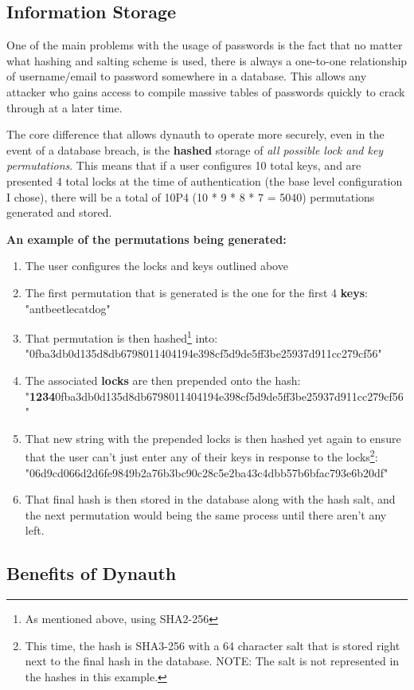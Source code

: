 \documentclass[conference]{IEEEtran}
\begin{document}
\subsection{Information Storage}
	One of the main problems with the usage of passwords is the fact that no matter what hashing and salting scheme is used, there is always a one-to-one relationship of username/email to password somewhere in a database. This allows any attacker who gains access to compile massive tables of passwords quickly to crack through at a later time.
	
	The core difference that allows dynauth to operate more securely, even in the event of a database breach, is the \textbf{hashed} storage of \textit{all possible lock and key permutations}. This means that if a user configures 10 total keys, and are presented 4 total locks at the time of authentication (the base level configuration I chose), there will be a total of 10P4 (10 * 9 * 8 * 7 = 5040) permutations generated and stored.
	
	\textbf{An example of the permutations being generated:}
	\begin{enumerate}
		\item The user configures the locks and keys outlined above
		\item The first permutation that is generated is the one for the first 4 \textbf{keys}: "antbeetlecatdog"
		\item That permutation is then hashed\footnote{As mentioned above, using SHA2-256} into: "0fba3db0d135d8db6798011404194e398cf5d9de5ff3be2\-5937d911cc279cf56"
		\item The associated \textbf{locks} are then prepended onto the hash: "\textbf{1234}0fba3db0d135d8db6798011404194e398cf5d9de5f\-f3be25937d911cc279cf56"
		\item That new string with the prepended locks is then hashed yet again to ensure that the user can't just enter any of their keys in response to the locks\footnote{This time, the hash is SHA3-256 with a 64 character salt that is stored right next to the final hash in the database. NOTE: The salt is not represented in the hashes in this example.}: "06d9cd066d2d6fe9849b2a76b3bc90c28c5e2ba43c4dbb\-57b6bfac793e6b20df"
		\item That final hash is then stored in the database along with the hash salt, and the next permutation would being the same process until there aren't any left.
	\end{enumerate}
\subsection{Benefits of Dynauth}
\end{document}

